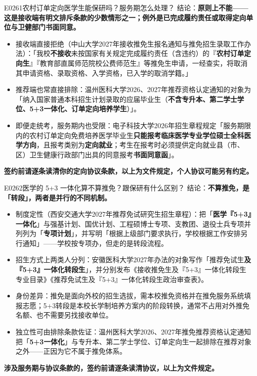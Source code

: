\begin{qa}{E0261}{农村订单定向医学生能保研吗？服务期怎么处理？}
结论：\textbf{原则上不能——这是接收端有明文排斥条款的少数情形之一；例外是已完成履约责任或取得定向单位与卫健部门书面同意。}
\begin{itemize}
  \item 接收端直接拒绝（中山大学2027年接收推免生报名通知与推免招生录取工作办法）：「我校\textbf{不接收}未按国家有关规定完成履约责任（含违约）的『\textbf{农村订单定向生}』『教育部直属师范院校公费师范生』等推免生申请，一经查实，将取消其申请资格、录取资格、入学资格，已入学的取消学籍。」
  \item 推荐端也常直接排除：温州医科大学2026、2027年推荐资格认定通知的对象为「纳入国家普通本科招生计划录取的应届毕业生（\textbf{不含专升本、第二学士学位、5+3一体化、订单定向培养学生}）」。
  \item 即便走统考，服务期内也受限：电子科技大学2026年招生章程规定「服务期限内的农村订单定向免费培养医学毕业生\textbf{只能报考临床医学专业学位硕士全科医学方向}，且报考类别为\textbf{定向就业}；考生在报考时必须提供定向就业县（市、区）卫生健康行政部门出具的同意报考\textbf{书面同意函}」。
\end{itemize}
\textbf{签约前请逐条读清你的定向协议条款，以上为文件规定，个人协议可能另有约定。}
\end{qa}

\begin{qa}{E0262}{医学的 5+3 一体化算不算推免？跟保研有什么区别？}
结论：\textbf{不算推免，是「转段」，两者是并行的不同机制。}
\begin{itemize}
  \item 制度定性（西安交通大学2027年推荐免试研究生招生章程）：把「\textbf{医学『5+3』一体化}」与强基计划、国优计划、工程硕博士专项、支教团、退役士兵专项并列列为「\textbf{专项计划}」，并写明「根据上级部门要求执行，学校根据工作安排另行通知」——学校按专项办，但走的是转段流程。
  \item 招生方式上两类人分列：安徽医科大学2027年办法的对象写作「推荐免试生\textbf{及『5+3』一体化转段生}」，并分别发布《接收推免生及『5+3』一体化转段生专业目录》《推荐免试生及『5+3』一体化转段生政治审查表》。
  \item 身份差异：推免是面向外校的招生选拔，需本校推免资格并在推免服务系统填报志愿；5+3转段是本校长学制培养方案内的阶段转换，通常不占用对外推免名额、也不需要另找接收单位。
  \item 独立性可由排除条款佐证：温州医科大学2026、2027年推免推荐资格认定通知把「\textbf{5+3一体化}」与专升本、第二学士学位、订单定向生一起排除在推荐对象之外——正因为它不属于推免体系。
\end{itemize}
\textbf{涉及服务期与协议条款的，签约前请逐条读清协议，以上为文件规定。}
\end{qa}

